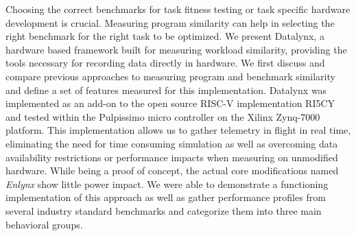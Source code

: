 Choosing the correct benchmarks for task fitness testing or task specific hardware development is crucial. Measuring program similarity can help in selecting the right benchmark for the right task to be optimized. We present Datalynx, a hardware based framework built for measuring workload similarity, providing the tools necessary for recording data directly in hardware. We first discuss and compare previous approaches to measuring program and benchmark similarity and define a set of features measured for this implementation. Datalynx was implemented as an add-on to the open source RISC-V implementation RI5CY and tested within the Pulpissimo micro controller on the Xilinx Zynq-7000 platform. This implementation allows us to gather telemetry in flight in real time, eliminating the need for time consuming simulation as well as overcoming data availability restrictions or performance impacts when measuring on unmodified hardware. While being a proof of concept, the actual core modifications named \emph{Enlynx} show little power impact. We were able to demonstrate a functioning implementation of this approach as well as gather performance profiles from several industry standard benchmarks and categorize them into three main behavioral groups.